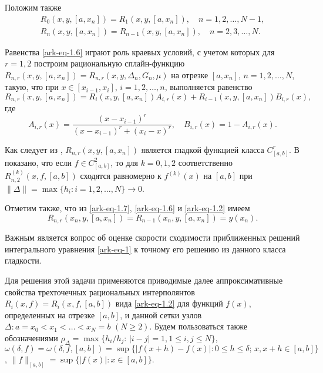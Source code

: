 Положим также
\begin{equation}\label{ark-eq-1.6}
\begin{array}{l}
 R_0(x,y,[a,x_n])=R_1(x,y,[a,x_n]),\quad n=1,2,\dots, N-1,\\
 R_n(x,y,[a,x_n])=R_{n-1}(x,y,[a,x_n]),\quad n=2,3,\dots, N.
\end{array}
\end{equation}

Равенства \eqref{ark-eq-1.6} играют роль краевых условий, с учетом которых
 для $r=1,2$ построим рациональную сплайн-функцию
$R_{n,r}(x,y,[a,x_n])=R_{n,r}(x,y,\Delta_n, G_n, \mu)$
на отрезке $[a,x_n]$, $n=1,2,\dots,N$, такую, что
при $x\in[x_{i-1},x_i]$, $i=1,2,\dots,n$, выполняется равенство
\begin{equation}\label{ark-eq-1.7}
R_{n,r}(x,y,[a,x_n])=R_i(x,y,[a,x_n])A_{i,r}(x)+R_{i-1}(x,y,[a,x_n])B_{i,r}(x),
\end{equation}
где
$$
A_{i,r}(x)=\frac{(x-x_{i-1})^r}{(x-x_{i-1})^r+(x_i-x)^r},\quad B_{i,r}(x)=1-A_{i,r}(x).
$$

Как следует из \cite{ark-9}, $R_{n,r}(x,y,[a,x_n])$ является гладкой функцией класса $C^r_{[a,b]}$.
В \cite{ark-11} показано, что если $f \in C^2_{[a,b]}$, то для $k=0,1,2$ соответственно
$R_{n,2}^{(k)}(x,f,[a,b])$ сходятся равномерно к $f^{(k)}(x)$ на $[a,b]$ при
$\|\Delta\|=\max\{h_i:i=1,2,\dots,N\}\to 0$.

Отметим также, что из \eqref{ark-eq-1.7}, \eqref{ark-eq-1.6} и \eqref{ark-eq-1.2} имеем
\begin{equation}\label{ark-eq-1.8}
R_{n,r}(x_n,y,[a,x_n])=R_{n-1}(x_n,y,[a,x_n])=y(x_n).
\end{equation}

Важным является вопрос об оценке скорости сходимости приближенных решений интегрального
уравнения \eqref{ark-eq-1} к точному его решению из данного класса гладкости.

Для решения этой задачи применяются приводимые далее аппроксимативные свойства
трехточечных рациональных интерполянтов $R_i(x,f)=R_i(x, f,[a,b])$ вида \eqref{ark-eq-1.2}
для функций $f(x)$, определенных на отрезке $[a,b]$, и данной сетки узлов
$\Delta: a=x_0<x_1<\dots<x_N=b$ $(N\geqslant 2)$. Будем пользоваться также
обозначениями
 $\rho_\Delta=\max\{h_i /h_j:\,|i-j|=1, 1\leqslant i, j\leqslant N\}$,
\newline $\omega(\delta, f)=\omega(\delta, f,[a,b])=\sup\{|f(x+h)-f(x)|:
0\leqslant h\leqslant \delta;\, x, x+h\in[a,b]\}$,
\newline $\|f\|_{[a,b]}=\sup\{|f(x)|: x\in[a,b]\}$.

